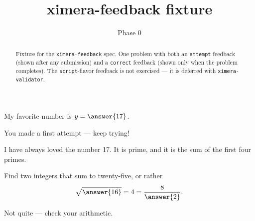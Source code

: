 \documentclass{ximera}
\title{ximera-feedback fixture}
\author{Phase 0}
\begin{document}
\begin{abstract}
Fixture for the \texttt{ximera-feedback} spec. One problem with both an \texttt{attempt} feedback (shown after any submission) and a \texttt{correct} feedback (shown only when the problem completes). The \texttt{script}-flavor feedback is not exercised --- it is deferred with \texttt{ximera-validator}.
\end{abstract}

\maketitle

\begin{problem}
  My favorite number is $y = \answer{17}$.

  \begin{feedback}[attempt]
    You made a first attempt --- keep trying!
  \end{feedback}

  \begin{feedback}[correct]
    I have always loved the number 17.  It is prime, and it is the sum of the first four primes.
  \end{feedback}
\end{problem}

\begin{problem}
  Find two integers that sum to twenty-five, or rather
  \[
    \sqrt{\answer{16}} = 4 = \frac{8}{\answer{2}}.
  \]

  \begin{feedback}[attempt]
    Not quite --- check your arithmetic.
  \end{feedback}
\end{problem}
\end{document}
